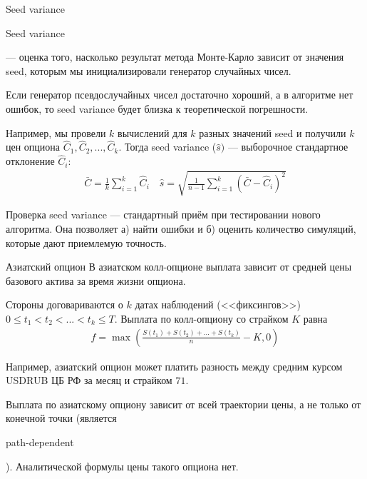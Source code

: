 \documentclass{beamer}
\newcommand{\en}[1]{\begin{otherlanguage}{english}#1\end{otherlanguage}}
\begin{document}
\begin{frame}{Seed variance}
\justify
\en{Seed variance} --- оценка того, насколько результат метода Монте-Карло зависит от значения seed, которым мы инициализировали генератор случайных чисел.

\justify
Если генератор псевдослучайных чисел достаточно хороший, а в алгоритме нет ошибок, то seed variance будет близка к теоретической погрешности.

\justify
Например, мы провели $k$ вычислений для $k$ разных значений seed и получили $k$ цен опциона $\hat{C}_1, \hat{C}_2,...,\hat{C}_k$. Тогда seed variance ($\hat{s})$
 --- выборочное стандартное отклонение $\hat{C}_i$:
\begin{align*}
\bar{C} = \frac{1}{k}\sum\limits_{i=1}^{k}\hat{C}_i \quad \hat{s} = \sqrt{\frac{1}{n-1}\sum\limits_{i=1}^{k}(\bar{C} - \hat{C}_i)^2} 
\end{align*}

\justify
Проверка seed variance --- стандартный приём при тестировании нового алгоритма. Она позволяет а) найти ошибки и б) оценить количество симуляций, которые дают приемлемую точность.
\end{frame}



\begin{frame}{Азиатский опцион}
\justify
В азиатском колл-опционе выплата зависит от средней цены базового актива за время жизни опциона.

\justify
Стороны договариваются о $k$ датах наблюдений (<<фиксингов>>) $0 \le t_1 < t_2 < ... < t_k \le T$. Выплата по колл-опциону со страйком $K$ равна
\begin{align*}
f = \max\left(\frac{S(t_1) + S(t_2) + ... + S(t_k)}{n} - K, 0\right)
\end{align*}

\justify
Например, азиатский опцион может платить разность между средним курсом USDRUB ЦБ РФ за месяц и страйком $71$. 

\justify
Выплата по азиатскому опциону зависит от всей траектории цены, а не только от конечной точки (является \en{path-dependent}). Аналитической формулы цены такого опциона нет. 
\end{frame}
\end{document}

